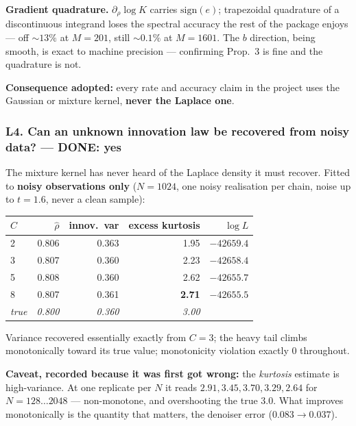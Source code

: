 \documentclass[11pt,a4paper]{article}
\newcommand{\done}{\textcolor{GoodGreen}{\textbf{DONE}}}
\begin{document}
\textbf{Gradient quadrature.} $\partial_\rho \log K$ carries $\mathrm{sign}(e)$; trapezoidal
quadrature of a discontinuous integrand loses the spectral accuracy the rest of the package
enjoys --- off ${\sim}13\%$ at $M=201$, still ${\sim}0.1\%$ at $M=1601$. The $b$ direction,
being smooth, is exact to machine precision --- confirming Prop.~3 is fine and the
quadrature is not.

\begin{keybox}
\textbf{Consequence adopted:} every rate and accuracy claim in the project uses the Gaussian
or mixture kernel, \textbf{never the Laplace one}.
\end{keybox}

\subsubsection*{L4. Can an unknown innovation law be recovered from noisy data? --- \done: yes}

The mixture kernel has never heard of the Laplace density it must recover. Fitted to
\textbf{noisy observations only} ($N=1024$, one noisy realisation per chain, noise up to
$t=1.6$, never a clean sample):

\begin{center}
\begin{tabular}{@{}lrrrr@{}}
\toprule
$C$ & $\hat\rho$ & innov.\ var & excess kurtosis & $\log L$ \\
\midrule
2 & 0.806 & 0.363 & 1.95 & $-42659.4$ \\
3 & 0.807 & 0.360 & 2.23 & $-42658.4$ \\
5 & 0.808 & 0.360 & 2.62 & $-42655.7$ \\
8 & 0.807 & 0.361 & \textbf{2.71} & $-42655.5$ \\
\emph{true} & \emph{0.800} & \emph{0.360} & \emph{3.00} & \\
\bottomrule
\end{tabular}
\end{center}

\noindent
Variance recovered essentially exactly from $C=3$; the heavy tail climbs monotonically
toward its true value; monotonicity violation exactly 0 throughout.

\textbf{Caveat, recorded because it was first got wrong:} the \emph{kurtosis} estimate is
high-variance. At one replicate per $N$ it reads $2.91, 3.45, 3.70, 3.29, 2.64$ for
$N=128\dots2048$ --- non-monotone, and overshooting the true 3.0. What improves monotonically
is the quantity that matters, the denoiser error ($0.083 \to 0.037$).
\end{document}
